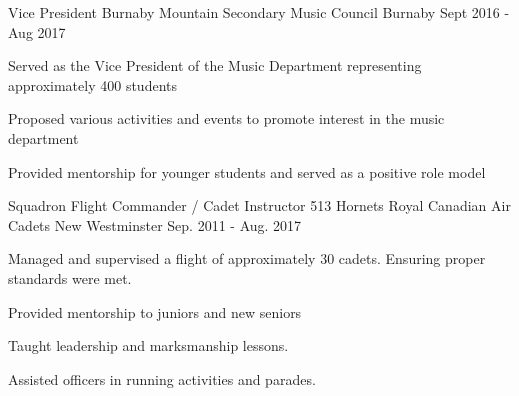 

\begin{cventries}

  \cventry
    {Vice President} %
    {Burnaby Mountain Secondary Music Council} %
    {Burnaby} %
    {Sept 2016 - Aug 2017} %
    {
      \begin{cvitems} %
        \item {Served as the Vice President of the Music Department representing approximately 400 students}
        \item {Proposed various activities and events to promote interest in the music department}
        \item {Provided mentorship for younger students and served as a positive role model}
      \end{cvitems}
    }
  \cventry
    {Squadron Flight Commander / Cadet Instructor} %
    {513 Hornets Royal Canadian Air Cadets} %
    {New Westminster} %
    {Sep. 2011 - Aug. 2017} %
    {
      \begin{cvitems} %
        \item {Managed and supervised a flight of approximately 30 cadets. Ensuring proper standards were met.}
        \item {Provided mentorship to juniors and new seniors}
        \item {Taught leadership and marksmanship lessons.}
        \item {Assisted officers in running activities and parades.}
      \end{cvitems}
    }

\end{cventries}
